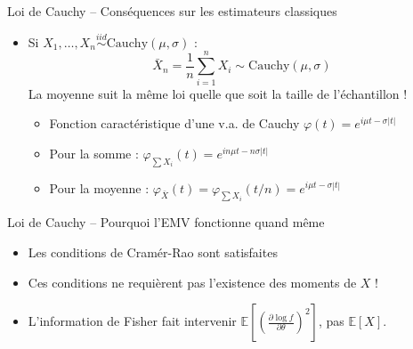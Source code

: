 \documentclass[11pt,aspectratio=169]{beamer}
\begin{document}
\begin{frame}{Loi de Cauchy -- Conséquences sur les estimateurs classiques}

\begin{itemize}

\item Si $X_1, \ldots, X_n \overset{iid}{\sim} \text{Cauchy}(\mu, \sigma)$ :
  \[
  \bar{X}_n = \frac{1}{n}\sum_{i=1}^n X_i \sim \text{Cauchy}(\mu, \sigma)
  \]
  La moyenne suit la même loi quelle que soit la taille de l'échantillon !\newline

  \begin{itemize}
    \item Fonction caractéristique d'une v.a. de Cauchy $\varphi(t) = e^{i\mu t - \sigma|t|}$\newline
    \item Pour la somme : $\varphi_{\sum X_i}(t) = e^{in\mu t - n\sigma|t|}$\newline
    \item Pour la moyenne : $\varphi_{\bar{X}}(t) = \varphi_{\sum X_i}(t/n) = e^{i\mu t - \sigma|t|}$
  \end{itemize}

\end{itemize}

\end{frame}

\begin{frame}{Loi de Cauchy -- Pourquoi l'EMV fonctionne quand même}

\begin{itemize}

\item Les conditions de Cramér-Rao sont satisfaites\newline

\item Ces conditions ne requièrent pas l'existence des moments de $X$ !\newline

\item L'information de Fisher fait intervenir $\mathbb{E}\left[\left(\frac{\partial \log f}{\partial \theta}\right)^2\right]$, pas $\mathbb{E}[X]$.

\end{itemize}

\end{frame}
\end{document}
